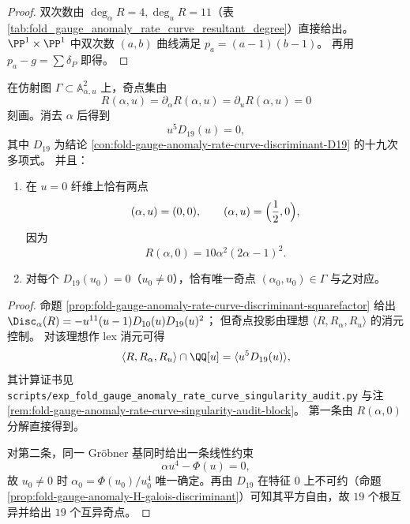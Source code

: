 \begin{proof}
双次数由 \(\deg_{\alpha}R=4,\deg_uR=11\)（表 \ref{tab:fold_gauge_anomaly_rate_curve_resultant_degree}）直接给出。
\(\PP^1\times\PP^1\) 中双次数 \((a,b)\) 曲线满足 \(p_a=(a-1)(b-1)\)。
再用 \(p_a-g=\sum\delta_P\) 即得。
\end{proof}

\begin{theorem}\label{thm:fold-gauge-anomaly-rate-curve-singular-elimination-u5d19}
在仿射图 \(\Gamma\subset\mathbb A^2_{\alpha,u}\) 上，奇点集由
\[
R(\alpha,u)=\partial_{\alpha}R(\alpha,u)=\partial_uR(\alpha,u)=0
\]
刻画。消去 \(\alpha\) 后得到
\[
u^5D_{19}(u)=0,
\]
其中 \(D_{19}\) 为结论 \ref{con:fold-gauge-anomaly-rate-curve-discriminant-D19} 的十九次多项式。
并且：
\begin{enumerate}
  \item 在 \(u=0\) 纤维上恰有两点
  \[
  (\alpha,u)=(0,0),\qquad (\alpha,u)=\Bigl(\frac12,0\Bigr),
  \]
  因为
  \[
  R(\alpha,0)=10\alpha^2(2\alpha-1)^2.
  \]
  \item 对每个 \(D_{19}(u_0)=0\)（\(u_0\neq0\)），恰有唯一奇点 \((\alpha_0,u_0)\in\Gamma\) 与之对应。
\end{enumerate}
\end{theorem}

\begin{proof}
命题 \ref{prop:fold-gauge-anomaly-rate-curve-discriminant-squarefactor} 给出
\(
\Disc_{\alpha}(R)=-u^{11}(u-1)D_{10}(u)D_{19}(u)^2
\)；
但奇点投影由理想 \(\langle R,R_{\alpha},R_u\rangle\) 的消元控制。
对该理想作 lex 消元可得
\[
\langle R,R_{\alpha},R_u\rangle\cap\QQ[u]=\langle u^5D_{19}(u)\rangle,
\]
其计算证书见
\texttt{scripts/exp\_fold\_gauge\_anomaly\_rate\_curve\_singularity\_audit.py}
与注 \ref{rem:fold-gauge-anomaly-rate-curve-singularity-audit-block}。
第一条由 \(R(\alpha,0)\) 分解直接得到。

对第二条，同一 Gröbner 基同时给出一条线性约束
\[
\alpha u^4-\Phi(u)=0,
\]
故 \(u_0\neq0\) 时
\(
\alpha_0=\Phi(u_0)/u_0^4
\)
唯一确定。再由 \(D_{19}\) 在特征 \(0\) 上不可约（命题 \ref{prop:fold-gauge-anomaly-H-galois-discriminant}）可知其平方自由，故 \(19\) 个根互异并给出 \(19\) 个互异奇点。
\end{proof}

